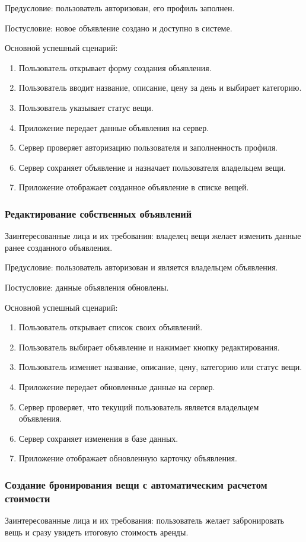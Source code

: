 Предусловие: пользователь авторизован, его профиль заполнен.

Постусловие: новое объявление создано и доступно в системе.

Основной успешный сценарий:
\begin{enumerate}
    \item Пользователь открывает форму создания объявления.
    \item Пользователь вводит название, описание, цену за день и выбирает категорию.
    \item Пользователь указывает статус вещи.
    \item Приложение передает данные объявления на сервер.
    \item Сервер проверяет авторизацию пользователя и заполненность профиля.
    \item Сервер сохраняет объявление и назначает пользователя владельцем вещи.
    \item Приложение отображает созданное объявление в списке вещей.
\end{enumerate}
\subsubsection{Редактирование собственных объявлений}
Заинтересованные лица и их требования: владелец вещи желает изменить данные ранее созданного объявления.

Предусловие: пользователь авторизован и является владельцем объявления.

Постусловие: данные объявления обновлены.

Основной успешный сценарий:
\begin{enumerate}
    \item Пользователь открывает список своих объявлений.
    \item Пользователь выбирает объявление и нажимает кнопку редактирования.
    \item Пользователь изменяет название, описание, цену, категорию или статус вещи.
    \item Приложение передает обновленные данные на сервер.
    \item Сервер проверяет, что текущий пользователь является владельцем объявления.
    \item Сервер сохраняет изменения в базе данных.
    \item Приложение отображает обновленную карточку объявления.
\end{enumerate}
\subsubsection{Создание бронирования вещи с автоматическим расчетом стоимости}
Заинтересованные лица и их требования: пользователь желает забронировать вещь и сразу увидеть итоговую стоимость аренды.

